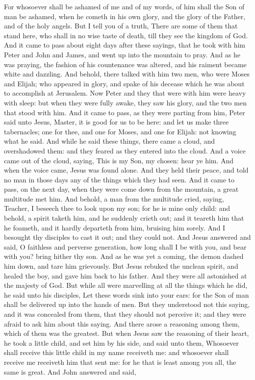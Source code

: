 For whosoever shall be ashamed of me and of my words, of him shall the Son of man be ashamed, when he cometh in his own glory, and the glory of the Father, and of the holy angels. But I tell you of a truth, There are some of them that stand here, who shall in no wise taste of death, till they see the kingdom of God.  And it came to pass about eight days after these sayings, that he took with him Peter and John and James, and went up into the mountain to pray. And as he was praying, the fashion of his countenance was altered, and his raiment became white and dazzling. And behold, there talked with him two men, who were Moses and Elijah; who appeared in glory, and spake of his decease which he was about to accomplish at Jerusalem. Now Peter and they that were with him were heavy with sleep: but when they were fully awake, they saw his glory, and the two men that stood with him. And it came to pass, as they were parting from him, Peter said unto Jesus, Master, it is good for us to be here: and let us make three tabernacles; one for thee, and one for Moses, and one for Elijah: not knowing what he said. And while he said these things, there came a cloud, and overshadowed them: and they feared as they entered into the cloud. And a voice came out of the cloud, saying, This is my Son, my chosen: hear ye him. And when the voice came, Jesus was found alone. And they held their peace, and told no man in those days any of the things which they had seen.  And it came to pass, on the next day, when they were come down from the mountain, a great multitude met him. And behold, a man from the multitude cried, saying, Teacher, I beseech thee to look upon my son; for he is mine only child: and behold, a spirit taketh him, and he suddenly crieth out; and it teareth him that he foameth, and it hardly departeth from him, bruising him sorely. And I besought thy disciples to cast it out; and they could not. And Jesus answered and said, O faithless and perverse generation, how long shall I be with you, and bear with you? bring hither thy son. And as he was yet a coming, the demon dashed him down, and tare him grievously. But Jesus rebuked the unclean spirit, and healed the boy, and gave him back to his father. And they were all astonished at the majesty of God. But while all were marvelling at all the things which he did, he said unto his disciples, Let these words sink into your ears: for the Son of man shall be delivered up into the hands of men. But they understood not this saying, and it was concealed from them, that they should not perceive it; and they were afraid to ask him about this saying.  And there arose a reasoning among them, which of them was the greatest. But when Jesus saw the reasoning of their heart, he took a little child, and set him by his side, and said unto them, Whosoever shall receive this little child in my name receiveth me: and whosoever shall receive me receiveth him that sent me: for he that is least among you all, the same is great.  And John answered and said, 